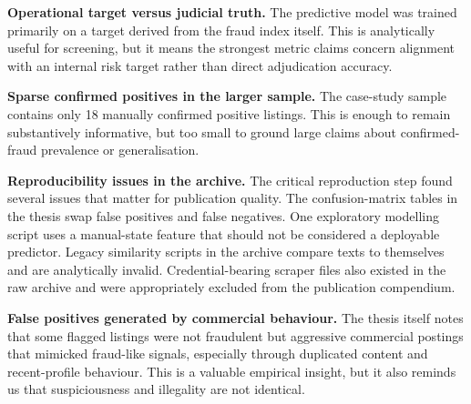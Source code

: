 \documentclass[11pt,a4paper]{article}
\begin{document}
\textbf{Operational target versus judicial truth.} The predictive model was trained primarily on a target derived from the fraud index itself. This is analytically useful for screening, but it means the strongest metric claims concern alignment with an internal risk target rather than direct adjudication accuracy.

\textbf{Sparse confirmed positives in the larger sample.} The case-study sample contains only 18 manually confirmed positive listings. This is enough to remain substantively informative, but too small to ground large claims about confirmed-fraud prevalence or generalisation.

\textbf{Reproducibility issues in the archive.} The critical reproduction step found several issues that matter for publication quality. The confusion-matrix tables in the thesis swap false positives and false negatives. One exploratory modelling script uses a manual-state feature that should not be considered a deployable predictor. Legacy similarity scripts in the archive compare texts to themselves and are analytically invalid. Credential-bearing scraper files also existed in the raw archive and were appropriately excluded from the publication compendium.

\textbf{False positives generated by commercial behaviour.} The thesis itself notes that some flagged listings were not fraudulent but aggressive commercial postings that mimicked fraud-like signals, especially through duplicated content and recent-profile behaviour. This is a valuable empirical insight, but it also reminds us that suspiciousness and illegality are not identical.
\end{document}
